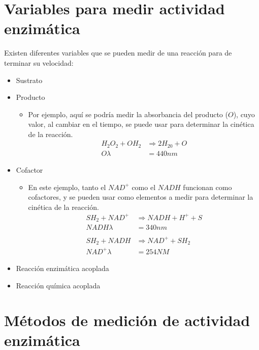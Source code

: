 \section{Variables para medir actividad enzimática}

Existen diferentes variables que se pueden medir de una reacción para de terminar su velocidad:

\begin{itemize}
    \item Sustrato
    \item Producto
        \begin{itemize}
            \item Por ejemplo, aquí se podría medir la absorbancia del producto ($O$), cuyo valor, al cambiar en el tiempo, se puede usar para determinar la cinética de la reacción.
                \begin{align*}
                H_2O_2 + OH_2 &\Longrightarrow 2H_20 + O
                \\
                O \lambda &= 440nm
                \end{align*}
        \end{itemize}
    \item Cofactor
        \begin{itemize}
            \item En este ejemplo, tanto el $NAD^+$ como el $NADH$ funcionan como cofactores, y se pueden usar como elementos a medir para determinar la cinética de la reacción.
                \begin{align*}
                SH_2 + NAD^{+} &\Longrightarrow NADH + H^{+} + S
                \\
                NADH \lambda &= 340nm
                \\
                \\
                SH_2 + NADH &\Longrightarrow NAD^{+} + SH_2
                \\
                NAD^{+} \lambda &= 254NM
                \end{align*}
                
        \end{itemize}
    \item Reacción enzimática acoplada
    \item Reacción química acoplada
\end{itemize}


\section{Métodos de medición de actividad enzimática}


